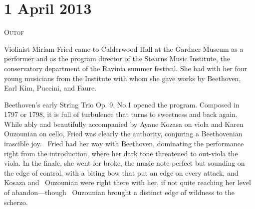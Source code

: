 
\chapter{1 April 2013}

\textsc{Outof}

Violinist Miriam Fried came to Calderwood Hall at the Gardner Museum as a performer and as the program director of the Stearns Music Institute, the conservatory department of the Ravinia summer festival. She had with her four young musicians from the Institute with whom she gave works by Beethoven, Earl Kim, Puccini, and Faure.

Beethoven’s early String Trio Op. 9, No.1 opened the program. Composed in 1797 or 1798, it is full of turbulence that turns to sweetness and back again. While ably and beautifully accompanied by Ayane Kozasa on viola and Karen Ouzounian on cello, Fried was clearly the authority, conjuring a Beethovenian irascible joy.  Fried had her way with Beethoven, dominating the performance right from the introduction, where her dark tone threatened to out-viola the viola. In the finale, she went for broke, the music note-perfect but sounding on the edge of control, with a biting bow that put an edge on every attack, and Kosaza and  Ouzounian were right there with her, if not quite reaching her level of abandon—though  Ouzounian brought a distinct edge of wildness to the scherzo.

